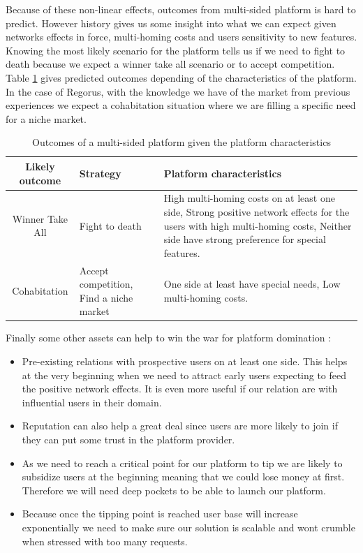 \documentclass[10pt]{report}
\begin{document}
Because of these non-linear effects, outcomes from multi-sided platform is hard to predict. However history gives us some insight into what we can expect given networks effects in force, multi-homing costs and users sensitivity to new features. Knowing the most likely scenario for the platform tells us if we need to fight to death because we expect a winner take all scenario or to accept competition. Table \ref{platformOutcomes} gives predicted outcomes depending of the characteristics of the platform. In the case of Regorus, with the knowledge we have of the market from previous experiences we expect a cohabitation situation where we are filling a specific need for a niche market.

\begin{table}[!ht]
\begin{center}
\begin{tabularx}{\textwidth}{cp{3.5cm}X}
\hline
Likely outcome & Strategy & Platform characteristics \tabularnewline
\hline
\hline
Winner Take All & Fight to death & High multi-homing costs on at least one side, Strong positive network effects for the users with high multi-homing costs, Neither side have strong preference for special features.\\
\hline
Cohabitation & Accept competition, Find a niche market & One side at least have special needs, Low multi-homing costs.\\
\hline
\end{tabularx}
\end{center}
\caption{Outcomes of a multi-sided platform given the platform characteristics}
\label{platformOutcomes}
\end{table}


Finally some other assets can help to win the war for platform domination \autocite{eisenmann2006strategies} :
\begin{itemize}
\item Pre-existing relations with prospective users on at least one side. This helps at the very beginning when we need to attract early users expecting to feed the positive network effects. It is even more useful if our relation are with influential users in their domain.
\item Reputation can also help a great deal since users are more likely to join if they can put some trust in the platform provider.
\item As we need to reach a critical point for our platform to tip we are likely to subsidize users at the beginning meaning that we could lose money at first. Therefore we will need deep pockets to be able to launch our platform.
\item Because once the tipping point is reached user base will increase exponentially we need to make sure our solution is scalable and wont crumble when stressed with too many requests.
\end{itemize}
\end{document}

